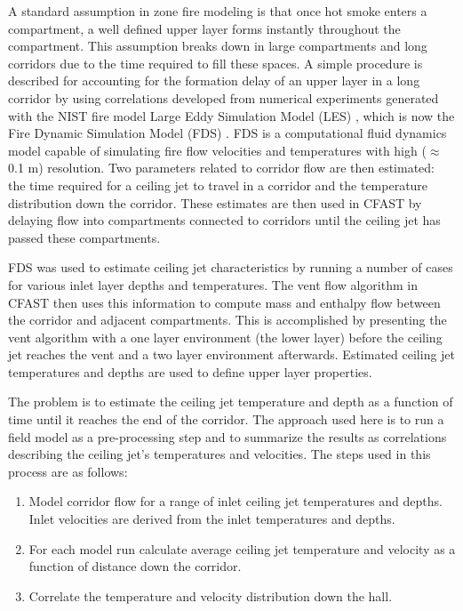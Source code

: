 A standard assumption in zone fire modeling is that once hot smoke enters a compartment, a well defined upper layer forms instantly throughout the compartment. This assumption breaks down in large compartments and long corridors due to the time required to fill these spaces.  A simple procedure is described for accounting for the formation delay of an upper layer in a long corridor by using correlations developed from numerical experiments generated with the NIST fire model Large Eddy Simulation Model (LES) , which is now the Fire Dynamic Simulation Model (FDS) \cite{FDS_Tech_Guide_5}.  FDS is a computational fluid dynamics model capable of simulating fire flow velocities and temperatures with high ($\approx$0.1 m) resolution.  Two parameters related to corridor flow are then estimated: the time required for a ceiling jet to travel in a corridor and the temperature distribution down the corridor.  These estimates are then used in CFAST by delaying flow into compartments connected to corridors until the ceiling jet has passed these compartments.

FDS was used to estimate ceiling jet characteristics by running a number of cases for various inlet layer depths and temperatures. The vent flow algorithm in CFAST then uses this information to compute mass and enthalpy flow between the corridor and adjacent compartments. This is accomplished by presenting the vent algorithm with a one layer environment (the lower layer) before the ceiling jet reaches the vent and a two layer environment afterwards. Estimated ceiling jet temperatures and depths are used to define upper layer properties.

The problem is to estimate the ceiling jet temperature and depth as a function of time until it reaches the end of the corridor.  The approach used here is to run a field model as a pre-processing step and to summarize the results as correlations describing the ceiling jet's temperatures and velocities. The steps used in this process are as follows:

\begin{enumerate}
\item Model corridor flow for a range of inlet ceiling jet temperatures and depths. Inlet velocities are derived from the inlet temperatures and depths.

\item For each model run calculate average ceiling jet temperature and velocity as a function of distance down the corridor.

\item Correlate the temperature and velocity distribution down the hall.
\end{enumerate}


